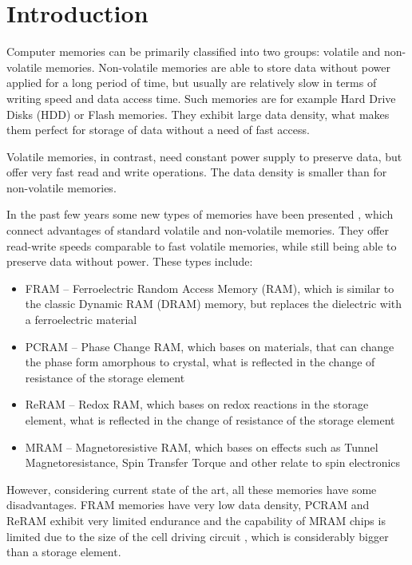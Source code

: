 \chapter{Introduction}
    Computer memories can be primarily classified into two groups: volatile and non-volatile memories. Non-volatile memories are able to store data without power applied for a long period of time, but usually are relatively slow in terms of writing speed and data access time. Such memories are for example Hard Drive Disks (HDD) or Flash memories. They exhibit large data density, what makes them perfect for storage of data without a need of fast access.
    
    Volatile memories, in contrast, need constant power supply to preserve data, but offer very fast read and write operations. The data density is smaller than for non-volatile memories.
    
    In the past few years some new types of memories have been presented \cite{fujisaki2013review,kent2015new}, which connect advantages of standard volatile and non-volatile memories. They offer read-write speeds comparable to fast volatile memories, while still being able to preserve data without power. These types include:
    
    \begin{itemize}[noitemsep,label=\textbullet]
    	\item FRAM -- Ferroelectric Random Access Memory (RAM), which is similar to the classic Dynamic RAM (DRAM) memory, but replaces the dielectric with a ferroelectric material
    	\item PCRAM -- Phase Change RAM, which bases on materials, that can change the phase form amorphous to crystal, what is reflected in the change of resistance of the storage element
    	\item ReRAM -- Redox RAM, which bases on redox reactions in the storage element, what is reflected in the change of resistance of the storage element
    	\item MRAM -- Magnetoresistive RAM, which bases on effects such as Tunnel Magnetoresistance, Spin Transfer Torque and other relate to spin electronics
    \end{itemize}
    
    However, considering current state of the art, all these memories have some disadvantages. FRAM memories have very low data density, PCRAM and ReRAM exhibit very limited endurance and the capability of MRAM chips is limited due to the size of the cell driving circuit \cite{kawahara20082}, which is considerably bigger than a storage element.
    
